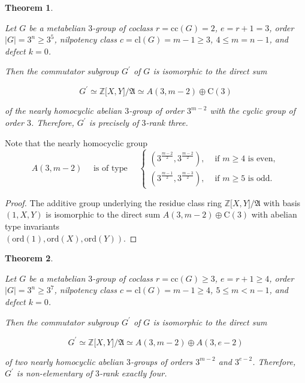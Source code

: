 \documentclass{amsart}
\newtheorem{theorem}{Theorem}[section]
\theoremstyle{definition}
\numberwithin{equation}{section}
\begin{document}
\begin{theorem}
\label{thm:ComSbgSecBic}

Let \(G\) be a metabelian \(3\)-group of coclass \(r=\mathrm{cc}(G)=2\), \(e=r+1=3\),
order \(\lvert G\rvert=3^n\ge 3^5\), nilpotency class \(c=\mathrm{cl}(G)=m-1\ge 3\), \(4\le m=n-1\),
and defect \(k=0\).

Then the commutator subgroup \(G^\prime\) of \(G\) is isomorphic to the direct sum
 
\begin{equation}
\label{eqn:ComSbgSecBic}
G^\prime\simeq\mathbb{Z}\lbrack X,Y\rbrack/\mathfrak{A}\simeq A(3,m-2)\oplus\mathrm{C}(3)
\end{equation}

\noindent
of the nearly homocyclic abelian \(3\)-group of order \(3^{m-2}\)
with the cyclic group of order \(3\).
Therefore, \(G^\prime\) is precisely of \(3\)-rank three.

\end{theorem}

\noindent
Note that the nearly homocyclic group
\[A(3,m-2)\quad\text{ is of type }\quad
\begin{cases}
\left(3^{\frac{m-2}{2}},3^{\frac{m-2}{2}}\right), &\text{ if } m\ge 4 \text{ is even},\\
\left(3^{\frac{m-1}{2}},3^{\frac{m-3}{2}}\right), &\text{ if } m\ge 5 \text{ is odd}.
\end{cases}\]

\begin{proof}
The additive group underlying the residue class ring
\(\mathbb{Z}\lbrack X,Y\rbrack/\mathfrak{A}\)
with basis \((1,X,Y)\) is isomorphic to the direct sum
\(A(3,m-2)\oplus\mathrm{C}(3)\)
with abelian type invariants\\
\(\left(\mathrm{ord}(1),\mathrm{ord}(X),\mathrm{ord}(Y)\right)\).
\end{proof}


\begin{theorem}
\label{thm:ComSbgLowBic}

Let \(G\) be a metabelian \(3\)-group of coclass \(r=\mathrm{cc}(G)\ge 3\), \(e=r+1\ge 4\),
order \(\lvert G\rvert=3^n\ge 3^7\), nilpotency class \(c=\mathrm{cl}(G)=m-1\ge 4\), \(5\le m<n-1\),
and defect \(k=0\).

Then the commutator subgroup \(G^\prime\) of \(G\) is isomorphic to the direct sum

\begin{equation}
\label{eqn:ComSbgLowBic}
G^\prime\simeq\mathbb{Z}\lbrack X,Y\rbrack/\mathfrak{A}\simeq A(3,m-2)\oplus A(3,e-2)
\end{equation}

\noindent
of two nearly homocyclic abelian \(3\)-groups of orders \(3^{m-2}\) and \(3^{e-2}\).
Therefore, \(G^\prime\) is non-elementary of \(3\)-rank exactly four.

\end{theorem}
\end{document}
